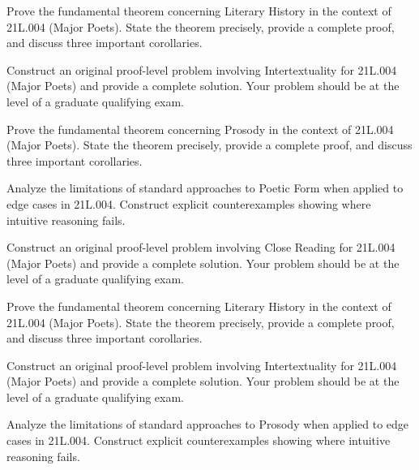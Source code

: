 \documentclass[12pt,a4paper]{exam}
\begin{document}
\begin{questions}
\vspace{0.3cm}

\question[5]
Prove the fundamental theorem concerning Literary History in the context of 21L.004 (Major Poets). State the theorem precisely, provide a complete proof, and discuss three important corollaries.

\vspace{0.3cm}

\question[3]
Construct an original proof-level problem involving Intertextuality for 21L.004 (Major Poets) and provide a complete solution. Your problem should be at the level of a graduate qualifying exam.

\vspace{0.3cm}

\question[4]
Prove the fundamental theorem concerning Prosody in the context of 21L.004 (Major Poets). State the theorem precisely, provide a complete proof, and discuss three important corollaries.

\vspace{0.3cm}

\question[4]
Analyze the limitations of standard approaches to Poetic Form when applied to edge cases in 21L.004. Construct explicit counterexamples showing where intuitive reasoning fails.

\vspace{0.3cm}

\question[3]
Construct an original proof-level problem involving Close Reading for 21L.004 (Major Poets) and provide a complete solution. Your problem should be at the level of a graduate qualifying exam.

\vspace{0.3cm}

\question[4]
Prove the fundamental theorem concerning Literary History in the context of 21L.004 (Major Poets). State the theorem precisely, provide a complete proof, and discuss three important corollaries.

\vspace{0.3cm}

\question[2]
Construct an original proof-level problem involving Intertextuality for 21L.004 (Major Poets) and provide a complete solution. Your problem should be at the level of a graduate qualifying exam.

\vspace{0.3cm}

\question[4]
Analyze the limitations of standard approaches to Prosody when applied to edge cases in 21L.004. Construct explicit counterexamples showing where intuitive reasoning fails.


\end{questions}
\end{document}
